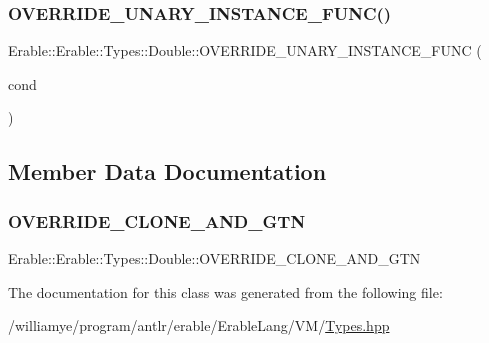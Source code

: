 \subsubsection{\texorpdfstring{OVERRIDE\_UNARY\_INSTANCE\_FUNC()}{OVERRIDE\_UNARY\_INSTANCE\_FUNC()}}
{\footnotesize\ttfamily Erable\+::\+Erable\+::\+Types\+::\+Double\+::\+O\+V\+E\+R\+R\+I\+D\+E\+\_\+\+U\+N\+A\+R\+Y\+\_\+\+I\+N\+S\+T\+A\+N\+C\+E\+\_\+\+F\+U\+NC (\begin{DoxyParamCaption}\item[{cond}]{ }\end{DoxyParamCaption})}



\subsection{Member Data Documentation}
\mbox{\label{class_erable_1_1_erable_1_1_types_1_1_double_ada5e03934cf7643e1e3fdbd592ffecc3}} 
\subsubsection{\texorpdfstring{OVERRIDE\_CLONE\_AND\_GTN}{OVERRIDE\_CLONE\_AND\_GTN}}
{\footnotesize\ttfamily Erable\+::\+Erable\+::\+Types\+::\+Double\+::\+O\+V\+E\+R\+R\+I\+D\+E\+\_\+\+C\+L\+O\+N\+E\+\_\+\+A\+N\+D\+\_\+\+G\+TN}



The documentation for this class was generated from the following file\+:\begin{DoxyCompactItemize}
\item 
/williamye/program/antlr/erable/\+Erable\+Lang/\+V\+M/\mbox{\hyperlink{_types_8hpp}{Types.\+hpp}}\end{DoxyCompactItemize}
